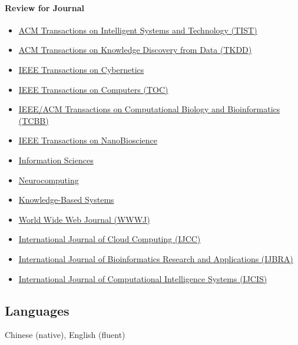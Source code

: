 \documentclass[10pt,a4paper]{article}
\newcommand{\tightlist}{%
  \setlength{\itemsep}{0pt}\setlength{\parskip}{0pt}}
\begin{document}
\paragraph{Review for Journal}\label{review-for-journal}

\begin{itemize}
\tightlist
\item
  \href{http://tist.acm.org/}{ACM Transactions on Intelligent Systems
  and Technology (TIST)}
\item
  \href{http://tkdd.acm.org/}{ACM Transactions on Knowledge Discovery
  from Data (TKDD)}
\item
  \href{http://ieeexplore.ieee.org/xpl/RecentIssue.jsp?punumber=6221036}{IEEE
  Transactions on Cybernetics}
\item
  \href{http://www.computer.org/portal/web/tc}{IEEE Transactions on
  Computers (TOC)}
\item
  \href{http://www.computer.org/portal/web/tcbb}{IEEE/ACM Transactions
  on Computational Biology and Bioinformatics (TCBB)}
\item
  \href{http://ieeexplore.ieee.org/xpl/RecentIssue.jsp?punumber=7728}{IEEE
  Transactions on NanoBioscience}
\item
  \href{http://ees.elsevier.com/ins}{Information Sciences}
\item
  \href{http://ees.elsevier.com/neucom}{Neurocomputing}
\item
  \href{http://ees.elsevier.com/knosys}{Knowledge-Based Systems}
\item
  \href{http://www.editorialmanager.com/wwwj/}{World Wide Web Journal
  (WWWJ)}
\item
  \href{http://www.inderscience.com/jhome.php?jcode=ijcc}{International
  Journal of Cloud Computing (IJCC)}
\item
  \href{http://www.inderscience.com/jhome.php?jcode=ijbra}{International
  Journal of Bioinformatics Research and Applications (IJBRA)}
\item
  \href{http://www.atlantis-press.com/publications/ijcis/}{International
  Journal of Computational Intelligence Systems (IJCIS)}
\end{itemize}

\subsection{Languages}\label{languages}

Chinese (native), English (fluent)
\end{document}
